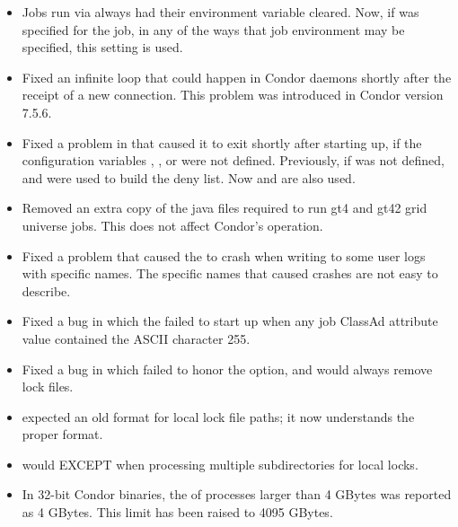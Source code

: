 \begin{itemize}
\item Jobs run via  always had their  environment
variable cleared.  Now, if  was specified for the job, 
in any of the ways that job environment may be specified, 
this setting is used.

\item Fixed an infinite loop that could happen in Condor daemons
shortly after the receipt of a new connection.  
This problem was introduced in Condor version 7.5.6.

\item Fixed a problem in  that caused it to exit shortly
after starting up,
if the configuration variables 
, , or  
were not defined.
Previously, if  was
not defined,  and 
were used to build the deny list.  
Now  and  are also used.

\item Removed an extra copy of the java files required to run gt4 and gt42
grid universe jobs. This does not affect Condor's operation.

\item Fixed a problem that caused the  to crash when
writing to some user logs with specific names.  The specific names that
caused crashes are not easy to describe.

\item Fixed a bug in which the  failed to start up
when any job ClassAd attribute value contained the ASCII character 255.

\item Fixed a bug in which  failed to honor the 
 option, and would always remove lock files.

\item {} expected an old format for local lock file paths;
it now understands the proper format.

\item {} would EXCEPT when processing multiple 
subdirectories for local locks.

\item In 32-bit Condor binaries, the  of processes larger than 
4 GBytes was reported as 4 GBytes.  This limit has been raised to 4095 GBytes.


\end{itemize}
